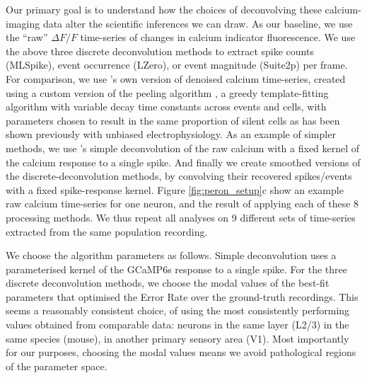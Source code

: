 \documentclass[a4paper,11pt]{article}
\begin{document}
Our primary goal is to understand how the choices of deconvolving these calcium-imaging data alter the scientific inferences we can draw.  As our baseline, we use the ``raw'' $\Delta F/F$ time-series of changes in calcium indicator fluorescence. We use the above three discrete deconvolution methods to extract spike counts (MLSpike), event occurrence (LZero), or event magnitude (Suite2p) per frame. For comparison, we use \citet{Peron2015-kd}'s own version of denoised calcium time-series, created using a custom version of the peeling algorithm \citep{Lutcke2013-wu}, a greedy template-fitting algorithm with variable decay time constants across events and cells, with parameters chosen to result in the same proportion of silent cells as has been shown previously with unbiased electrophysiology. As an example of simpler methods, we use \citet{Yaksi2006-ic}'s simple deconvolution of the raw calcium with a fixed kernel of the calcium response to a single spike. And finally we create smoothed versions of the discrete-deconvolution methods, by convolving their recovered spikes/events with a fixed spike-response kernel. Figure \ref{fig:peron_setup}c show an example raw calcium time-series for one neuron, and the result of applying each of these 8 processing methods. We thus repeat all analyses on 9 different sets of time-series extracted from the same population recording. 

We choose the algorithm parameters as follows. Simple deconvolution \citep{Yaksi2006-ic} uses a parameterised kernel of the GCaMP6s response to a single spike. For the three discrete deconvolution methods, we choose the modal values of the best-fit parameters that optimised the Error Rate over the ground-truth recordings. This seems a reasonably consistent choice, of using the most consistently performing values obtained from comparable data: neurons in the same layer (L2/3) in the same species (mouse), in another primary sensory area (V1). Most importantly for our purposes, choosing the modal values means we avoid pathological regions of the parameter space.
\end{document}
